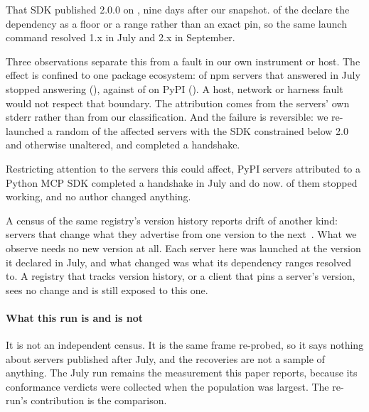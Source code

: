 That SDK published 2.0.0 on \SDKTwoDate{}, nine days after our snapshot.
\NSDKTwoRange{} of the \NSDKTwoBroke{} declare the dependency as a floor or a range
rather than an exact pin, so the same launch command resolved 1.x in July and 2.x in
September.

Three observations separate this from a fault in our own instrument or host.
The effect is confined to one package ecosystem: \NpmLost{} of \NpmWas{} npm servers
that answered in July stopped answering (\NpmLostRate{}), against \PypiLost{} of
\PypiWas{} on PyPI (\PypiLostRate{}). A host, network or harness fault would not
respect that boundary. The attribution comes from the servers' own stderr rather than
from our classification. And the failure is reversible: we re-launched a random
\NPinTested{} of the affected servers with the SDK constrained below 2.0 and
otherwise unaltered, and \NPinRestored{} completed a handshake.

Restricting attention to the servers this could affect, \NPySDKWas{} PyPI servers
attributed to a Python MCP SDK completed a handshake in July and \NPySDKNow{} do now.
\PySDKLostCI{} of them stopped working, and no author changed anything.

A census of the same registry's version history reports drift of another
kind: servers that change what they advertise from one version to the
next~\cite{mcpsilentdrift}. What we observe needs no new version at all. Each
server here was launched at the version it declared in July, and what changed was
what its dependency ranges resolved to. A registry that tracks version history, or a
client that pins a server's version, sees no change and is still exposed to this one.

\paragraph{What this run is and is not}
It is not an independent census. It is the same frame re-probed, so it says nothing
about servers published after July, and the \NGained{} recoveries are not a sample of
anything. The July run remains the measurement this paper reports, because its
conformance verdicts were collected when the population was largest. The re-run's
contribution is the comparison.
